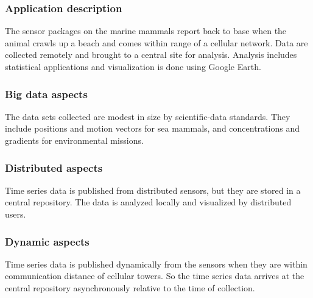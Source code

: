 \subsubsection*{Application description}


The sensor packages on the marine mammals report back to base when the animal crawls up a beach and comes within range of a cellular network. Data are collected remotely and brought to a central site for analysis. Analysis includes statistical applications and visualization is done using Google Earth.


 \subsubsection*{Big data aspects}



The data sets collected are modest in size by scientific-data standards. They include positions and motion vectors for sea mammals, and concentrations and gradients for environmental missions.

 \subsubsection*{Distributed aspects}



Time series data is published from distributed sensors, but they are stored in a central repository. The data is analyzed locally and visualized by distributed users.

 \subsubsection*{Dynamic aspects}



Time series data is published dynamically from the sensors when they are within communication distance of cellular towers. So the time series data arrives at the central repository asynchronously relative to the time of collection.

